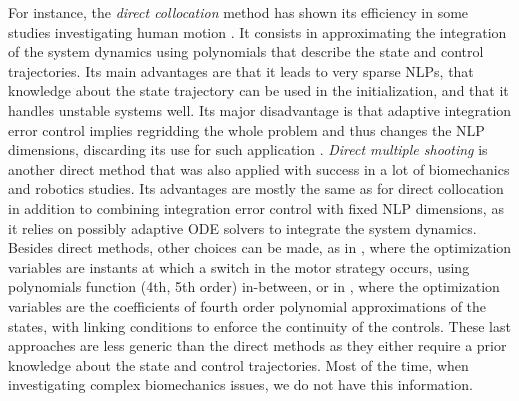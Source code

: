 For instance, the \textit{direct collocation} method has shown its efficiency in some studies investigating human motion \cite{febrer-nafriaComparisonDifferentOptimal2020, ezatiComparisonDirectCollocation2020}.
It consists in approximating the integration of the system dynamics using polynomials that describe the state and control trajectories.
Its main advantages are that it leads to very sparse NLPs, that knowledge about the state trajectory can be used in the initialization, and that it handles unstable systems well. 
Its major disadvantage is that adaptive integration error control implies regridding the whole problem and thus changes the NLP dimensions, discarding its use for such application \cite{diehl2006fast}.
\textit{Direct multiple shooting} is another direct method that was also applied with success in a lot of biomechanics \cite{koschorreck2012modeling, felis2013modeling, charbonneau2020optimal, bailly2020optimal} and robotics \cite{diehl2006fast, giftthaler2018control, bailly2018mechanical} studies.
Its advantages are mostly the same as for direct collocation in addition to combining integration error control with fixed NLP dimensions, as it relies on possibly adaptive ODE solvers to integrate the system dynamics.
Besides direct methods, other choices can be made, as in \cite{yeadon2000mechanics, begon2009effect}, where the optimization variables are instants at which a switch in the motor strategy occurs, using polynomials function (4th, 5th order) in-between, or in \cite{leboeuf2006energetic, huchez2015local}, where the optimization variables are the coefficients of fourth order polynomial approximations of the states, with linking conditions to enforce the continuity of the controls. 
These last approaches are less generic than the direct methods as they either require a prior knowledge about the state and control trajectories. 
Most of the time, when investigating complex biomechanics issues, we do not have this information. 

